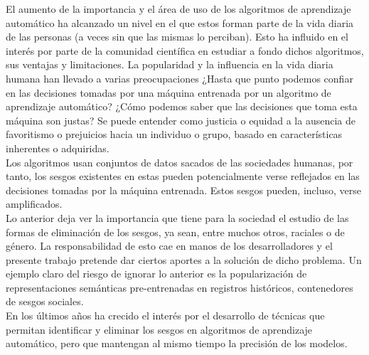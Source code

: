 \documentclass[runningheads,a4paper]{llncs}
\begin{document}
El aumento de la importancia y el área de uso de los algoritmos de aprendizaje automático ha alcanzado un nivel en el que estos forman parte de la vida diaria de las personas (a veces sin que las mismas lo perciban). Esto ha influido en el interés por parte de la comunidad científica en estudiar a fondo dichos algoritmos, sus ventajas y limitaciones. La popularidad y la influencia en la vida diaria humana han llevado a varias preocupaciones ¿Hasta que punto podemos confiar en las decisiones tomadas por una máquina entrenada por un algoritmo de aprendizaje automático? ¿Cómo podemos saber que las decisiones que toma esta máquina son justas? Se puede entender como justicia o equidad a la ausencia de favoritismo o prejuicios hacia un individuo o grupo, basado en características inherentes o adquiridas.\\
Los algoritmos usan conjuntos de datos sacados de las sociedades humanas, por tanto, los sesgos existentes en estas pueden potencialmente verse reflejados en las decisiones tomadas por la máquina entrenada. Estos sesgos pueden, incluso, verse amplificados.\\
Lo anterior deja ver la importancia que tiene para la sociedad el estudio de las formas de eliminación de los sesgos, ya sean, entre muchos otros, raciales o de género. La responsabilidad de esto cae en manos de los desarrolladores y el presente trabajo pretende dar ciertos aportes a la solución de dicho problema. Un ejemplo claro del riesgo de ignorar lo anterior es la popularización de representaciones semánticas pre-entrenadas en registros históricos, contenedores de sesgos sociales.\\
En los últimos años ha crecido el interés por el desarrollo de técnicas que permitan identificar y eliminar los sesgos en algoritmos de aprendizaje automático, pero que mantengan al mismo tiempo la precisión de los modelos.\\
\end{document}
